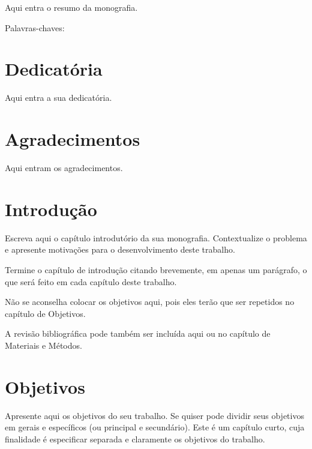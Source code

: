 \documentclass[12pt,a4paper,header]{abnt}
\begin{document}
\begin{resumo}
Aqui entra o resumo da monografia.

\vspace{1cm}
\noindent Palavras-chaves: 


\end{resumo}



\chapter*{Dedicatória}
Aqui entra a sua dedicatória. 



\chapter*{Agradecimentos}
Aqui entram os agradecimentos. 



\tableofcontents{}
\listoffigures
\listoftables



\chapter{Introdução} \label{cap:introducao}

Escreva aqui o capítulo introdutório da sua monografia. Contextualize o problema e apresente motivações para o desenvolvimento deste trabalho. 

Termine o capítulo de introdução citando brevemente, em apenas um parágrafo, o que será feito em cada capítulo deste trabalho.

Não se aconselha colocar os objetivos aqui, pois eles terão que ser repetidos no capítulo de Objetivos.

A revisão bibliográfica pode também ser incluída aqui ou no capítulo de Materiais e Métodos.


\chapter{Objetivos}
Apresente aqui os objetivos do seu trabalho. Se quiser pode dividir seus objetivos em gerais e específicos (ou principal e secundário). Este é um capítulo curto, cuja finalidade é especificar separada e claramente os objetivos do trabalho.
\end{document}
